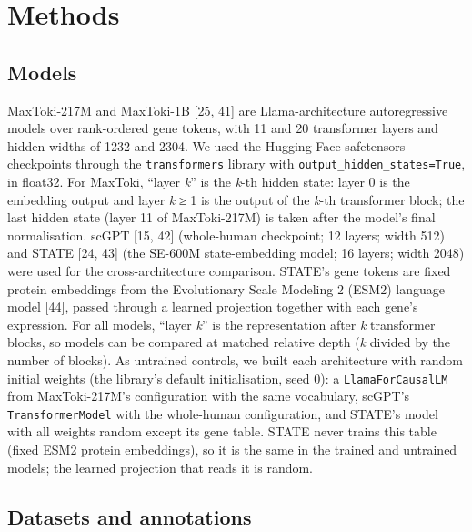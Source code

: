 \documentclass[
  11pt,
]{article}
\begin{document}
\section{Methods}\label{methods}

\subsection{Models}\label{models}

MaxToki-217M and MaxToki-1B {[}25, 41{]} are Llama-architecture
autoregressive models over rank-ordered gene tokens, with 11 and 20
transformer layers and hidden widths of 1232 and 2304. We used the
Hugging Face safetensors checkpoints through the \texttt{transformers}
library with \texttt{output\_hidden\_states=True}, in float32. For
MaxToki, ``layer \emph{k}'' is the \emph{k}-th hidden state: layer 0 is
the embedding output and layer \emph{k} ≥ 1 is the output of the
\emph{k}-th transformer block; the last hidden state (layer 11 of
MaxToki-217M) is taken after the model's final normalisation. scGPT
{[}15, 42{]} (whole-human checkpoint; 12 layers; width 512) and STATE
{[}24, 43{]} (the SE-600M state-embedding model; 16 layers; width 2048)
were used for the cross-architecture comparison. STATE's gene tokens are
fixed protein embeddings from the Evolutionary Scale Modeling 2 (ESM2)
language model {[}44{]}, passed through a learned projection together
with each gene's expression. For all models, ``layer \emph{k}'' is the
representation after \emph{k} transformer blocks, so models can be
compared at matched relative depth (\emph{k} divided by the number of
blocks). As untrained controls, we built each architecture with random
initial weights (the library's default initialisation, seed 0): a
\texttt{LlamaForCausalLM} from MaxToki-217M's configuration with the
same vocabulary, scGPT's \texttt{TransformerModel} with the whole-human
configuration, and STATE's model with all weights random except its gene
table. STATE never trains this table (fixed ESM2 protein embeddings), so
it is the same in the trained and untrained models; the learned
projection that reads it is random.

\subsection{Datasets and annotations}\label{datasets-and-annotations}
\end{document}
